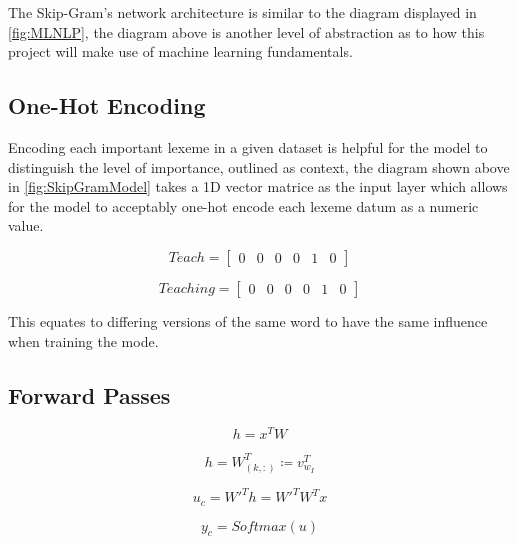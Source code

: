 The Skip-Gram's network architecture is similar to the diagram displayed in \autoref{fig:MLNLP}, the diagram above is another level of abstraction as to how this project will make use of machine learning fundamentals.

\subsection{One-Hot Encoding}

Encoding each important lexeme in a given dataset is helpful for the model to distinguish the level of importance, outlined as context, the diagram shown above in \autoref{fig:SkipGramModel} takes a 1D vector matrice as the input layer which allows for the model to acceptably one-hot encode each lexeme datum as a numeric value.

\begin{multicols}{2}
    \begin{equation*}
        Teach =
        \begin{bmatrix}
            0 & 0 & 0 & 0 & 1 & 0
        \end{bmatrix}
    \end{equation*}

    \begin{equation*}
        Teaching =
        \begin{bmatrix}
            0 & 0 & 0 & 0 & 1 & 0
        \end{bmatrix}
    \end{equation*}
\end{multicols}

This equates to differing versions of the same word to have the same influence when training the mode.

\subsection{Forward Passes}

\begin{equation}
    h = x^T W
\end{equation}


\begin{equation}
    h = W_{(k,:)}^{T} \coloneqq v_{w_I}^{T}
\end{equation}


\begin{equation}
    u_{c} = W'^{T}h = W'^{T} W^{T}x
\end{equation}


\begin{equation}
    y_{c} = Softmax(u)
\end{equation}


